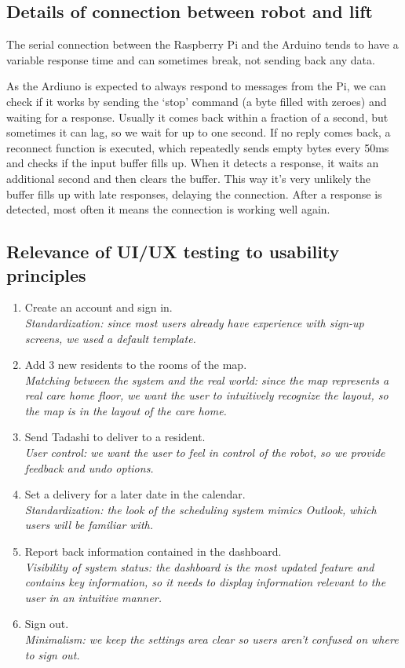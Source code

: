 \documentclass{article}
\begin{document}
\subsection{Details of connection between robot and lift}
\label{connection}
The serial connection between the Raspberry Pi and the Arduino tends to have a variable response time and can sometimes break, not sending back any data.

As the Ardiuno is expected to always respond to messages from the Pi, we can check if it works by sending the `stop' command (a byte filled with zeroes) and waiting for a response. Usually it comes back within a fraction of a second, but sometimes it can lag, so we wait for up to one second. If no reply comes back, a reconnect function is executed, which repeatedly sends empty bytes every 50ms and checks if the input buffer fills up. When it detects a response, it waits an additional second and then clears the buffer. This way it's very unlikely the buffer fills up with late responses, delaying the connection. After a response is detected, most often it means the connection is working well again.

\subsection{Relevance of UI/UX testing to usability principles}
\label{usability}
\begin{enumerate}
  \item Create an account and sign in. \\{\it Standardization: since most users already have experience with sign-up screens, we used a default template.}
  \item Add 3 new residents to the rooms of the map. \\{\it Matching between the system and the real world: since the map represents a real care home floor, we want the user to intuitively recognize the layout, so the map is in the layout of the care home.}
  \item Send Tadashi to deliver to a resident. \\{\it User control: we want the user to feel in control of the robot, so we provide feedback and undo options.}
  \item Set a delivery for a later date in the calendar. \\{\it Standardization: the look of the scheduling system mimics Outlook, which users will be familiar with.}
  \item Report back information contained in the dashboard. \\{\it Visibility of system status: the dashboard is the most updated feature and contains key information, so it needs to display information relevant to the user in an intuitive manner.}
  \item Sign out. \\{\it Minimalism: we keep the settings area clear so users aren't confused on where to sign out.}
\end{enumerate}
\end{document}
